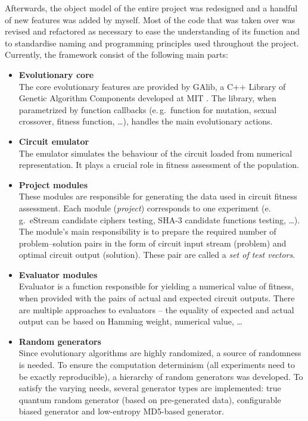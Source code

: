 \documentclass[12pt,oneside]{fithesis2}
\begin{document}
Afterwards, the object model of the entire project was redesigned and a handful of new features was added by myself. 
Most of the code that was taken over was revised and refactored as necessary
to ease the understanding of its function and to standardise naming and programming principles used throughout the project. 
Currently, the framework consist of the following main parts:
\begin{itemize}
\item \textbf{Evolutionary core}\\
The core evolutionary features are provided by GAlib, a C++ Library of Genetic Algorithm Components developed at MIT \parencite{galib}.
The library, when parametrized by function callbacks (e.\,g.\ function for mutation, sexual crossover, fitness function, \dots),
handles the main evolutionary actions.
\item \textbf{Circuit emulator}\\
The emulator simulates the behaviour of the circuit loaded from numerical representation. It plays a crucial role in
fitness assessment of the population.
\item \textbf{Project modules}\\
These modules are responsible for generating the data used in circuit fitness assessment. Each module (\textit{project}) corresponds
to one experiment (e.\,g.\ eStream candidate ciphers testing, SHA-3 candidate functions testing, \dots). The module's main
responsibility is to prepare the required number of problem--solution pairs in the form of circuit input stream (problem)
and optimal circuit output (solution). These pair are called a \textit{set of test vectors}.
\item \textbf{Evaluator modules}\\
Evaluator is a function responsible for yielding a numerical value of fitness, when provided with the pairs of
actual and expected circuit outputs. There are multiple approaches to evaluators -- the equality of expected and
actual output can be based on Hamming weight, numerical value, \dots
\item \textbf{Random generators}\\
Since evolutionary algorithms are highly randomized, a source of randomness is needed. To ensure the
computation determinism (all experiments need to be exactly reproducible), a hierarchy of random generators was developed.
To satisfy the varying needs, several generator types are implemented: true quantum random generator (based on pre-generated data),
configurable biased generator and low-entropy MD5-based generator.

\end{itemize}
\end{document}
